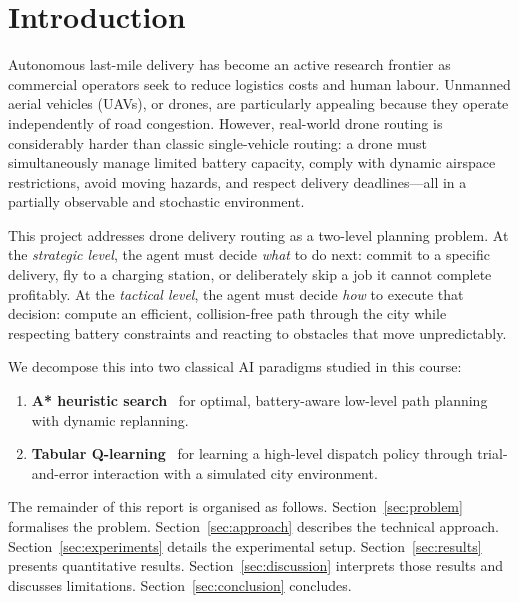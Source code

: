 \documentclass[11pt,twocolumn]{article}
\begin{document}
\section{Introduction}
\label{sec:intro}

Autonomous last-mile delivery has become an active research frontier as
commercial operators seek to reduce logistics costs and human labour.
Unmanned aerial vehicles (UAVs), or drones, are particularly appealing
because they operate independently of road congestion.
However, real-world drone routing is considerably harder than classic
single-vehicle routing: a drone must simultaneously manage limited battery
capacity, comply with dynamic airspace restrictions, avoid moving hazards,
and respect delivery deadlines---all in a partially observable and
stochastic environment.

This project addresses drone delivery routing as a two-level planning
problem.
At the \emph{strategic level}, the agent must decide \emph{what} to do
next: commit to a specific delivery, fly to a charging station, or
deliberately skip a job it cannot complete profitably.
At the \emph{tactical level}, the agent must decide \emph{how} to execute
that decision: compute an efficient, collision-free path through the city
while respecting battery constraints and reacting to obstacles that move
unpredictably.

We decompose this into two classical AI paradigms studied in this course:
\begin{enumerate}[leftmargin=*, nosep]
    \item \textbf{A* heuristic search}~\cite{hart1968} for optimal,
          battery-aware low-level path planning with dynamic replanning.
    \item \textbf{Tabular Q-learning}~\cite{watkins1992} for learning a
          high-level dispatch policy through trial-and-error interaction
          with a simulated city environment.
\end{enumerate}

The remainder of this report is organised as follows.
Section~\ref{sec:problem} formalises the problem.
Section~\ref{sec:approach} describes the technical approach.
Section~\ref{sec:experiments} details the experimental setup.
Section~\ref{sec:results} presents quantitative results.
Section~\ref{sec:discussion} interprets those results and discusses
limitations.
Section~\ref{sec:conclusion} concludes.

\end{document}
